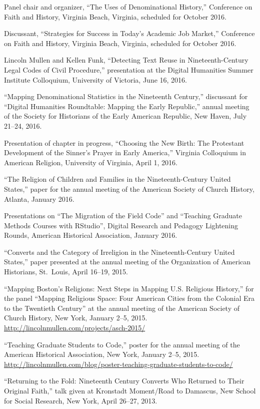 \documentclass[11pt]{article}
\begin{document}
Panel chair and organizer, ``The Uses of Denominational History,'' Conference 
on Faith and History, Virginia Beach, Virginia, scheduled for October 2016.

Discussant, ``Strategies for Success in Today's Academic Job Market,'' 
Conference on Faith and History, Virginia Beach, Virginia, scheduled for 
October 2016.

Lincoln Mullen and Kellen Funk, ``Detecting Text Reuse in Nineteenth-Century 
Legal Codes of Civil Procedure,'' presentation at the Digital Humanities 
Summer Institute Colloquium, University of Victoria, June 16, 2016.

``Mapping Denominational Statistics in the Nineteenth Century,'' discussant 
for ``Digital Humanities Roundtable: Mapping the Early Republic,'' annual 
meeting of the Society for Historians of the Early American Republic, New 
Haven, July 21--24, 2016.

Presentation of chapter in progress, ``Choosing the New Birth: The Protestant 
Development of the Sinner's Prayer in Early America,'' Virginia Colloquium in 
American Religion, University of Virginia, April 1, 2016.

``The Religion of Children and Families in the Nineteenth-Century United 
States,'' paper for the annual meeting of the American Society of 
Church History, Atlanta, January 2016.

Presentations on ``The Migration of the Field Code'' and ``Teaching 
Graduate Methods Courses with RStudio'', Digital Research and Pedagogy 
Lightening Rounds, American Historical Association, January 2016.

``Converts and the Category of Irreligion in the Nineteenth-Century
United States,'' paper presented at the annual meeting of the
Organization of American Historians, St.~Louis, April 16--19, 2015.

``Mapping Boston's Religions: Next Steps in Mapping U.S. Religious History,'' 
for the panel ``Mapping Religious Space: Four American Cities from the 
Colonial Era to the Twentieth Century'' at the annual meeting of the American 
Society of Church History, New York, January 2--5, 2015.  
\url{http://lincolnmullen.com/projects/asch-2015/}

``Teaching Graduate Students to Code,'' poster for the annual meeting of the
American Historical Association, New York, January 2--5, 2015.
\url{http://lincolnmullen.com/blog/poster-teaching-graduate-students-to-code/}

``Returning to the Fold: Nineteenth Century Converts Who Returned to
Their Original Faith,'' talk given at Kronstadt Moment/Road to Damascus,
New School for Social Research, New York, April 26--27, 2013.
\end{document}
